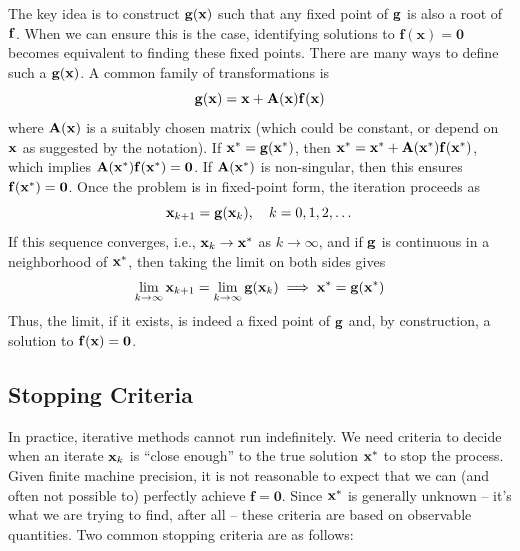 The key idea is to construct $\mathbf{g}(\mathbf{x})$ such that any fixed point of $\mathbf{g}$ is also a root of $\mathbf{f}$. When we can ensure this is the case, identifying solutions to $\mathbf f(\mathbf x) = \mathbf 0$ becomes equivalent to finding these fixed points. There are many ways to define such a $\mathbf{g}(\mathbf{x})$. A common family of transformations is
\begin{equation}
    \mathbf{g}(\mathbf{x}) = \mathbf{x} + \mathbf{A}(\mathbf{x})\mathbf{f}(\mathbf{x})
\end{equation}
where $\mathbf{A}(\mathbf{x})$ is a suitably chosen matrix (which could be constant, or depend on $\mathbf{x}$ as suggested by the notation). If $\mathbf{x}^* = \mathbf{g}(\mathbf{x}^*)$, then $\mathbf{x}^* = \mathbf{x}^* + \mathbf{A}(\mathbf{x}^*)\mathbf{f}(\mathbf{x}^*)$, which implies $\mathbf{A}(\mathbf{x}^*)\mathbf{f}(\mathbf{x}^*) = \mathbf{0}$. If $\mathbf{A}(\mathbf{x}^*)$ is non-singular, then this ensures $\mathbf{f}(\mathbf{x}^*) = \mathbf{0}$. Once the problem is in fixed-point form, the iteration proceeds as
\begin{equation}
    \mathbf{x}_{k+1} = \mathbf{g}(\mathbf{x}_k), \quad k = 0, 1, 2, \dots
\end{equation}
If this sequence converges, i.e., $\mathbf{x}_k \to \mathbf{x}^*$ as $k \to \infty$, and if $\mathbf{g}$ is continuous in a neighborhood of $\mathbf{x}^*$, then taking the limit on both sides gives
\begin{equation} 
\lim_{k\to\infty} \mathbf{x}_{k+1} = \lim_{k\to\infty} \mathbf{g}(\mathbf{x}_k) \implies \mathbf{x}^* = \mathbf{g}(\mathbf{x}^*) 
\end{equation}
Thus, the limit, if it exists, is indeed a fixed point of $\mathbf{g}$ and, by construction, a solution to $\mathbf{f}(\mathbf{x}) = \mathbf{0}$.

\subsection{Stopping Criteria}
In practice, iterative methods cannot run indefinitely. We need criteria to decide when an iterate $\mathbf{x}_k$ is ``close enough'' to the true solution $\mathbf{x}^*$ to stop the process. Given finite machine precision, it is not reasonable to expect that we can (and often not possible to) perfectly achieve $\mathbf f = \mathbf 0$. Since $\mathbf{x}^*$ is generally unknown -- it's what we are trying to find, after all -- these criteria are based on observable quantities. Two common stopping criteria are as follows:

